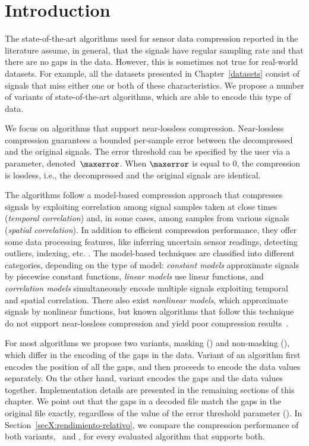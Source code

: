 

\section{Introduction}
\label{algo:overview}


The state-of-the-art algorithms used for sensor data compression reported in the literature \cite{AnEva2013, Signal2016} assume, in general, that the signals have regular sampling rate and that there are no gaps in the data. However, this is sometimes not true for real-world datasets. For example, all the datasets presented in Chapter~\ref{datasets} consist of signals that miss either one or both of these characteristics. We propose a number of variants of state-of-the-art algorithms, which are able to encode this type of data. 


We focus on algorithms that support near-lossless compression. Near-lossless compression guarantees a bounded per-sample error between the decompressed and the original signals. The error threshold can be specified by the user via a parameter, denoted~$\maxerror$. When $\maxerror$ is equal to 0, the compression is lossless, i.e., the decompressed and the original signals are identical.


The algorithms follow a model-based compression approach that compresses signals by exploiting correlation among signal samples taken at close times (\textit{temporal correlation}) and, in some cases, among samples from various signals (\textit{spatial correlation}). In addition to efficient compression performance, they offer some data processing features, like inferring uncertain sensor readings, detecting outliers, indexing, etc. \cite{AnEva2013}. The model-based techniques are classified into different categories, depending on the type of model: \textit{constant models} approximate signals by piecewise constant functions, \textit{linear models} use linear functions, and \textit{correlation models} simultaneously encode multiple signals exploiting temporal and spatial correlation. There also exist \textit{nonlinear models}, which approximate signals by nonlinear functions, but known algorithms that follow this technique do not support near-lossless compression and yield poor compression results~\cite{AnEva2013}. 


For most algorithms we propose two variants, masking (\maskalgo) and non-masking (\NOmaskalgo), which differ in the encoding of the gaps in the data. Variant \maskalgo of an algorithm first encodes the position of all the gaps, and then proceeds to encode the data values separately. On the other hand, variant \NOmaskalgo encodes the gaps and the data values together. Implementation details are presented in the remaining sections of this chapter. We point out that the gaps in a decoded file match the gaps in the original file exactly, regardless of the value of the error threshold parameter (\maxerror). In Section~\ref{secX:rendimiento-relativo}, we compare the compression performance of both variants, \maskalgo\ and \NOmaskalgo, for every evaluated algorithm that supports both.


